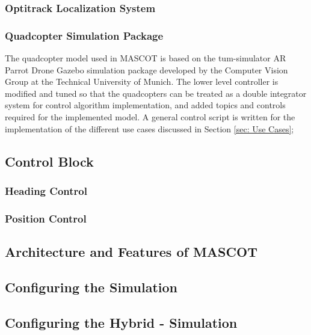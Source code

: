 \documentclass[letterpaper, 10 pt, conference]{ieeeconf}
\begin{document}
\subsubsection{Optitrack Localization System}


\subsubsection{Quadcopter Simulation Package}
The quadcopter model used in MASCOT is based on the tum-simulator AR Parrot Drone Gazebo simulation package \cite{Tum} developed by the Computer Vision Group at the Technical University of Munich. The lower level controller is modified and tuned so that the quadcopters can be treated as a double integrator system for control algorithm implementation, and added topics and controls required for the implemented model. A general control script is written for the implementation of the different use cases discussed in Section \ref{sec: Use Cases};





\subsection{Control Block}

\subsubsection{Heading Control}

\subsubsection{Position Control}


\subsection{Architecture and Features of MASCOT}

\subsection{Configuring the Simulation}

\subsection{Configuring the Hybrid - Simulation}


\end{document}
